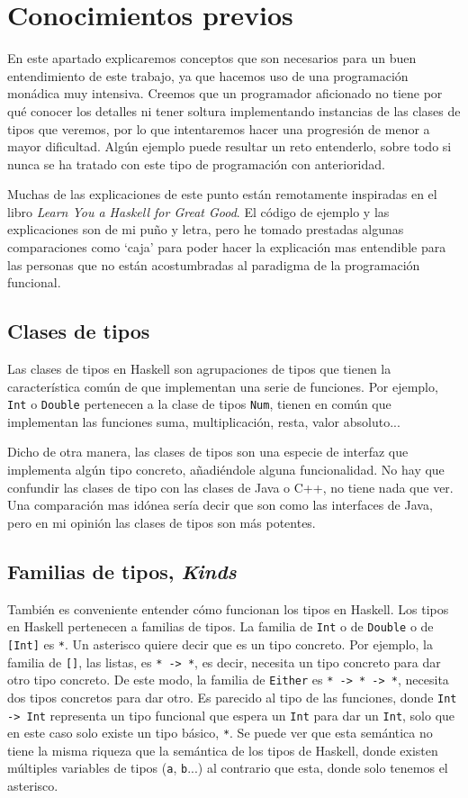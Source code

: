 \documentclass[class=article, crop=false]{standalone}
\begin{document}
\section{Conocimientos previos}\label{sec:con_prev}
En este apartado explicaremos conceptos que son necesarios para un buen entendimiento de este
trabajo, ya que hacemos uso de una programación monádica muy intensiva. Creemos que un
programador aficionado no tiene por qué conocer los detalles ni tener soltura implementando
instancias de las clases de tipos que veremos, por lo que intentaremos hacer una progresión
de menor a mayor dificultad. Algún ejemplo puede resultar un reto entenderlo, sobre todo si
nunca se ha tratado con este tipo de programación con anterioridad.

Muchas de las explicaciones de este punto están remotamente inspiradas en el libro\textit{
Learn You a Haskell for Great Good}\cite{Lipovaca:2011:LYH:2018642}. El código de ejemplo y
las explicaciones son de mi puño y letra, pero he tomado prestadas algunas comparaciones como
`caja' para poder hacer la explicación mas entendible para las personas que no están
acostumbradas al paradigma de la programación funcional.

\subsection{Clases de tipos}
Las clases de tipos en Haskell son agrupaciones de tipos que tienen la característica común
de que implementan una serie de funciones. Por ejemplo, \verb`Int` o \verb`Double` pertenecen
a la clase de tipos \verb`Num`, tienen en común que implementan las funciones suma,
multiplicación, resta, valor absoluto...

Dicho de otra manera, las clases de tipos son una especie de interfaz que implementa algún
tipo concreto, añadiéndole alguna funcionalidad. No hay que confundir las clases de tipo con
las clases de Java o C++, no tiene nada que ver. Una comparación mas idónea sería decir que
son como las interfaces de Java, pero en mi opinión las clases de tipos son más potentes.

\subsection{Familias de tipos, \textit{Kinds}}
También es conveniente entender cómo funcionan los tipos en Haskell. Los tipos en Haskell
pertenecen a familias de tipos. La familia de \verb`Int` o de \verb`Double` o de \verb`[Int]`
es \verb`*`. Un asterisco quiere decir que es un tipo concreto. Por ejemplo, la familia de
\verb`[]`, las listas, es \verb`* -> *`, es decir, necesita un tipo concreto para dar otro
tipo concreto. De este modo, la familia de \verb`Either` es \verb`* -> * -> *`, necesita dos
tipos concretos para dar otro. Es parecido al tipo de las funciones, donde \verb`Int -> Int`
representa un tipo funcional que espera un \verb`Int` para dar un \verb`Int`, solo que en
este caso solo existe un tipo básico, \verb`*`. Se puede ver que esta semántica no tiene la
misma riqueza que la semántica de los tipos de Haskell, donde existen múltiples variables de
tipos (\verb`a`, \verb`b`...) al contrario que esta, donde solo tenemos el asterisco.
\end{document}

